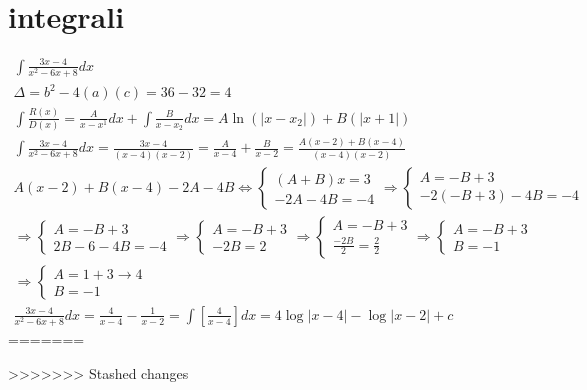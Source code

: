 \documentclass{article}
\newcommand{\abs}[1]{\lvert#1\rvert}
\begin{document}
\section{integrali}
\begin{equation*}
	\begin{matrix}
		\int\frac{3x-4}{x^2-6x+8}dx\\
		\Delta=b^2-4(a)(c)=36-32=4\\
		\int\frac{R(x)}{D(x)}=\frac{A}{x-x^1}dx+\int\frac{B}{x-x_2}dx=A\ln(\abs{x-x_2})+B(\abs{x+1})\\
		\int\frac{3x-4}{x^2-6x+8}dx=\frac{3x-4}{(x-4)(x-2)}=\frac{A}{x-4}+\frac{B}{x-2}=\frac{A(x-2)+B(x-4)}{(x-4)(x-2)}\\
		A(x-2)+B(x-4)-2A-4B\Leftrightarrow\begin{cases}
			(A+B)x=3 \\
			-2A-4B=-4
		\end{cases}\Rightarrow\begin{cases}
			A=-B+3\\
			-2(-B+3)-4B=-4
		\end{cases}\\\Rightarrow\begin{cases}
			A=-B+3\\
			2B-6-4B=-4
		\end{cases}\Rightarrow\begin{cases}
			A=-B+3\\
			-2B=2
		\end{cases}\Rightarrow\begin{cases}
			A=-B+3\\
			\frac{-2B}{2}=\frac{2}{2}
		\end{cases}\Rightarrow\begin{cases}
			A=-B+3\\
			B=-1
		\end{cases}\\
		\Rightarrow\begin{cases}
			A=1+3\to 4\\
			B=-1
		\end{cases}\\
		\frac{3x-4}{x^2-6x+8}dx=\frac{4}{x-4}-\frac{1}{x-2}=\int\left[\frac{4}{x-4}\right]dx=4\log\abs{x-4}-\log\abs{x-2}+c
	\end{matrix}
\end{equation*}
=======

>>>>>>> Stashed changes
\end{document}
